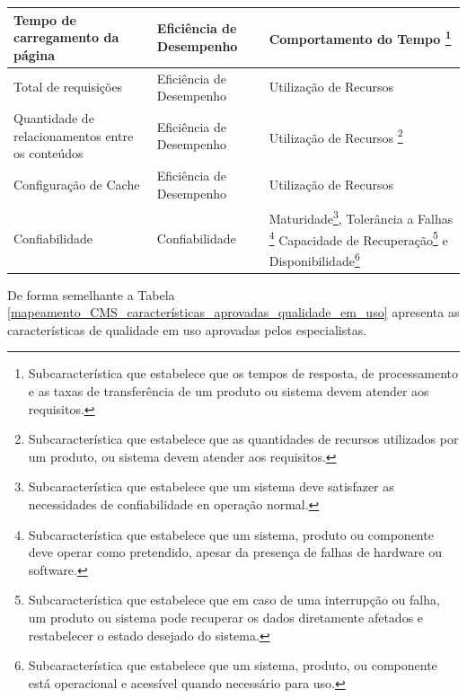 \begin{longtable}{|p{140pt}|p{140pt}|p{120pt}|}
{\raggedright Tempo de carregamento da página}
 	 & {\raggedright Eficiência de Desempenho}
 	 & {\raggedright Comportamento do Tempo \footnote{Subcaracterística que estabelece que os tempos de resposta, de processamento e as taxas de transferência de um produto ou sistema devem atender aos requisitos.}}\\
 	\hline
 	 {\raggedright Total de requisições}
 	 & {\raggedright Eficiência de Desempenho}
 	 & {\raggedright Utilização de Recursos}\\
 	\hline 
 	{\raggedright Quantidade de relacionamentos entre os conteúdos}
 	 	 & {\raggedright Eficiência de Desempenho}
 	 	 & {\raggedright Utilização de Recursos \footnote{Subcaracterística que estabelece que as quantidades de recursos utilizados por um produto, ou sistema devem atender aos requisitos.}}\\
 	 	\hline
{\raggedright Configuração de Cache}
 	 & {\raggedright Eficiência de Desempenho}
 	 & {\raggedright Utilização de Recursos}\\
 	\hline
 	 		{\raggedright Confiabilidade}
 	 	 	 	 	 & {\raggedright Confiabilidade}
 	 	 	 	 	 & {\raggedright Maturidade\footnote{Subcaracterística que estabelece que um sistema deve satisfazer as necessidades de confiabilidade en operação normal.},
 	 	 	 	 	 Tolerância a Falhas \footnote{Subcaracterística que estabelece que um sistema, produto ou componente deve operar como pretendido, apesar da presença de falhas de hardware ou software.}
 	 	 	 	 	 Capacidade de Recuperação\footnote{Subcaracterística que estabelece que em caso de uma interrupção ou falha, um produto ou sistema pode recuperar os dados diretamente afetados e restabelecer o estado desejado do sistema.} e
 	 	 	 	 	 Disponibilidade\footnote{Subcaracterística que estabelece que um sistema, produto, ou componente está operacional e acessível quando necessário para uso.} 
 	 	 	 	 	 }\\
 	 	 	 	 	\hline	
 	\end{longtable}
De forma semelhante a Tabela \ref{mapeamento_CMS_características_aprovadas_qualidade_em_uso} apresenta as características de qualidade em uso aprovadas pelos especialistas.

